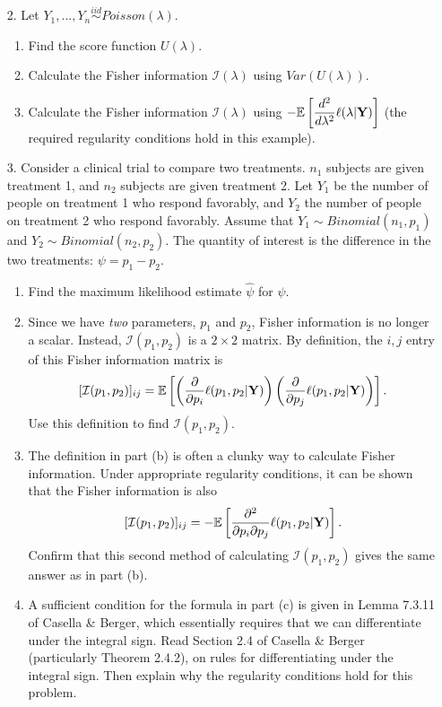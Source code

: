 \documentclass[11pt]{article}
\begin{document}
\begin{enumerate}
\item[2.] Let $Y_1,...,Y_n \overset{iid}{\sim} Poisson(\lambda)$.
\begin{enumerate}
\item Find the score function $U(\lambda)$.
\item Calculate the Fisher information $\mathcal{I}(\lambda)$ using $Var(U(\lambda))$.
\item Calculate the Fisher information $\mathcal{I}(\lambda)$ using $-\mathbb{E}\left[ \dfrac{d^2}{d \lambda^2} \ell(\lambda | {\bf Y}) \right]$ (the required regularity conditions hold in this example).
\end{enumerate}

\item[3.] Consider a clinical trial to compare two treatments. $n_1$ subjects are given treatment 1, and $n_2$ subjects are given treatment 2. Let $Y_1$ be the number of people on treatment 1 who respond favorably, and $Y_2$ the number of people on treatment 2 who respond favorably. Assume that $Y_1 \sim Binomial(n_1, p_1)$ and $Y_2 \sim Binomial(n_2, p_2)$. The quantity of interest is the difference in the two treatments: $\psi = p_1 - p_2$.

\begin{enumerate}
\item Find the maximum likelihood estimate $\widehat{\psi}$ for $\psi$.

\item Since we have \textit{two} parameters, $p_1$ and $p_2$, Fisher information is no longer a scalar. Instead, $\mathcal{I}(p_1, p_2)$ is a $2 \times 2$ matrix. By definition, the $i,j$ entry of this Fisher information matrix is
$$[\mathcal{I}(p_1, p_2)]_{ij} = \mathbb{E} \left[ \left(\frac{\partial}{\partial p_i} \ell(p_1, p_2 | {\bf Y}) \right) \left(\frac{\partial}{\partial p_j} \ell(p_1, p_2 | {\bf Y}) \right) \right]. $$
Use this definition to find $\mathcal{I}(p_1, p_2)$.

\item The definition in part (b) is often a clunky way to calculate Fisher information. Under appropriate regularity conditions, it can be shown that the Fisher information is also
$$[\mathcal{I}(p_1, p_2)]_{ij} = - \mathbb{E}\left[ \frac{\partial^2}{\partial p_i \partial p_j} \ell(p_1, p_2 | {\bf Y}) \right].$$
Confirm that this second method of calculating $\mathcal{I}(p_1, p_2)$ gives the same answer as in part (b).

\item A sufficient condition for the formula in part (c) is given in Lemma 7.3.11 of Casella \& Berger, which essentially requires that we can differentiate under the integral sign. Read Section 2.4 of Casella \& Berger (particularly Theorem 2.4.2), on rules for differentiating under the integral sign. Then explain why the regularity conditions hold for this problem.
\end{enumerate}
\end{enumerate}
\end{document}
